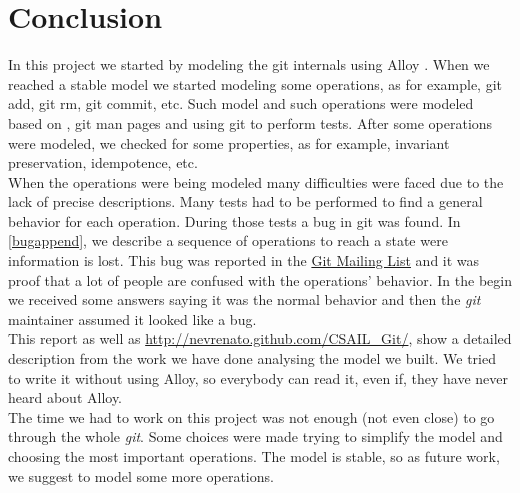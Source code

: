 \chapter{Conclusion}
In this project we started by modeling the git internals using Alloy
\cite{Jackson:2006:SAL:1146359}. When we reached
a stable model we started modeling some operations, as for example, git
add, git rm, git commit, etc. Such model and such
operations were modeled based on \cite{gitComm}, \cite{progit} git man
pages and using git to perform tests. After some operations were
modeled, we checked for some properties, as for example, invariant
preservation, idempotence, etc.\\

When the operations were being modeled many
difficulties were faced due to the lack of precise descriptions. 
Many tests had to be performed to find a general behavior for each
operation. During those tests a bug in git was found. In
\ref{bugappend}, we describe a
sequence of operations to reach a state were information is lost. This
bug was reported in the \href{mailto:git@vger.kernel.org}{Git Mailing
List} and it was proof that a lot of people are confused with the
operations' behavior. In the begin we received some answers saying it
was the normal behavior and then the \emph{git} maintainer assumed it
looked like a bug.\\

This report as well as
\href{http://nevrenato.github.com/CSAIL_Git/}{http://nevrenato.github.com/CSAIL\_Git/},
show a detailed description from the work we have done analysing the
model we built. We tried to write it without using Alloy, so
everybody can read it, even if, they have never heard about Alloy.\\

The time we had to work on this project was not enough (not even close) to
go through the whole \emph{git}. Some choices were made trying to
simplify the model and choosing the most important operations. The
model is stable, so as future work, we suggest to model some more
operations.
